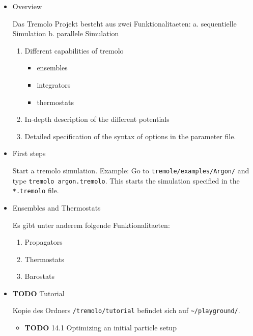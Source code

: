\documentclass[11pt]{article}
\begin{document}
\begin{itemize}

\item Overview\\
\label{sec-4.1.2.1}

Das Tremolo Projekt besteht aus zwei Funktionalitaeten:
a. sequentielle Simulation 
b. parallele Simulation

\begin{enumerate}
\item Different capabilities of tremolo

\begin{itemize}
\item ensembles
\item integrators
\item thermostats
\end{itemize}

\item In-depth description of the different potentials
\item Detailed specification of the syntax of options in the parameter file.
\end{enumerate}

\item First steps\\
\label{sec-4.1.2.2}

Start a tremolo simulation. Example:
Go to \texttt{tremole/examples/Argon/} and type \texttt{tremolo argon.tremolo}. This starts the simulation specified in the \texttt{*.tremolo} file. 


\item Ensembles and Thermostats\\
\label{sec-4.1.2.3}

Es gibt unter anderem folgende Funktionalitaeten:
\begin{enumerate}
\item Propagators
\item Thermostats
\item Barostats
\end{enumerate}

\item \textbf{TODO} Tutorial\\
\label{sec-4.1.2.4}

Kopie des Ordners \texttt{/tremolo/tutorial} befindet sich auf \texttt{\textasciitilde{}/playground/}. 

\begin{itemize}

\item \textbf{TODO} 14.1 Optimizing an initial particle setup\\
\label{sec-4.1.2.4.1}


\end{itemize}
\end{itemize}
\end{document}
